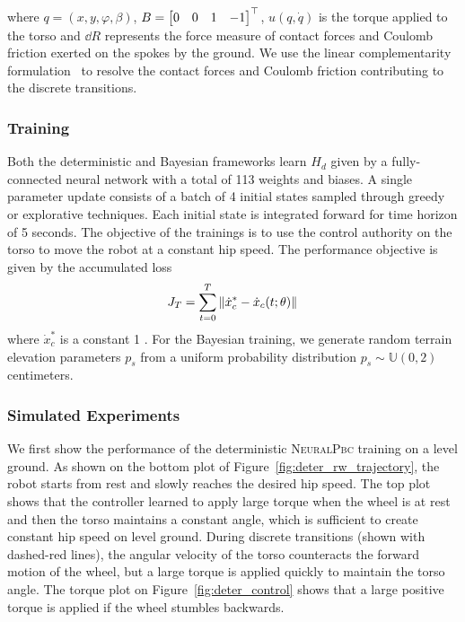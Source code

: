 \noindent where $q = (x, y, \varphi, \beta)$, $B = \begin{bmatrix}0 & 0 & 1 & -1\end{bmatrix}^\top$,
$u(q, \dot{q})$ is the torque applied to the torso and $\dd R$ represents the
force measure of contact forces and Coulomb friction exerted on the spokes by
the ground. We use the linear complementarity
formulation~\cite{glocker2005formulation} to resolve the contact forces and
Coulomb friction contributing to the discrete transitions.


\subsubsection{Training}
\label{sssec:training}

Both the deterministic and Bayesian frameworks learn $H_d$ given by a
fully-connected neural network with a total of 113 weights and biases.   
%
A single parameter update consists of a batch of 4 initial states sampled
through greedy or explorative techniques.
%
Each initial state is integrated forward for time horizon of 5 seconds.
%
The objective of the trainings is to use the control authority on the torso to
move the robot at a constant hip speed.
%
The performance objective is given by the accumulated loss
\begin{align}
    J_T = \sum_{t=0}^{T} \|{\dot{x}_c^* - \dot{x}_c(t; \theta)}\|_{{}_{}}
    \label{eq:loss}
\end{align}
\noindent where $\dot{x}_c^*$ is a constant 1 .
%
For the Bayesian training, we generate random terrain elevation parameters $p_s$
from a uniform probability distribution $p_s \sim \mathbb{U}(0, 2)$ centimeters.


\subsubsection{Simulated Experiments}

We first show the performance of the deterministic \textsc{NeuralPbc} training
on a level ground.
%
As shown on the bottom plot of Figure~\ref{fig:deter_rw_trajectory}, the robot
starts from rest and slowly reaches the desired hip speed.
%
The top plot shows that the controller learned to apply large torque
when the wheel is at rest and then the torso maintains a constant angle, which
is sufficient to create constant hip speed on level ground.  
%
During discrete transitions (shown with dashed-red lines), the angular velocity
of the torso counteracts the forward motion of the wheel, but a large torque is
applied quickly to maintain the torso angle.
%
The torque plot on Figure~\ref{fig:deter_control} shows that a large
positive torque is applied if the wheel stumbles backwards.
%

